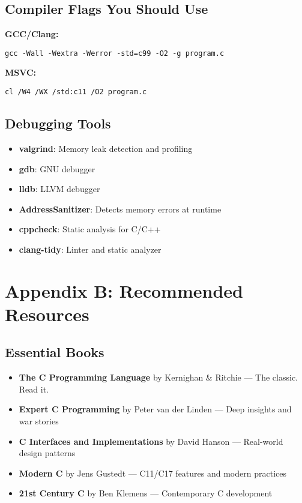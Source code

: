\documentclass[11pt,openany]{book}
\begin{document}
\section*{Compiler Flags You Should Use}

\textbf{GCC/Clang:}
\begin{verbatim}
gcc -Wall -Wextra -Werror -std=c99 -O2 -g program.c
\end{verbatim}

\textbf{MSVC:}
\begin{verbatim}
cl /W4 /WX /std:c11 /O2 program.c
\end{verbatim}

\section*{Debugging Tools}

\begin{itemize}
    \item \textbf{valgrind}: Memory leak detection and profiling
    \item \textbf{gdb}: GNU debugger
    \item \textbf{lldb}: LLVM debugger
    \item \textbf{AddressSanitizer}: Detects memory errors at runtime
    \item \textbf{cppcheck}: Static analysis for C/C++
    \item \textbf{clang-tidy}: Linter and static analyzer
\end{itemize}

\chapter{Appendix B: Recommended Resources}

\section*{Essential Books}

\begin{itemize}
    \item \textbf{The C Programming Language} by Kernighan \& Ritchie — The classic. Read it.
    \item \textbf{Expert C Programming} by Peter van der Linden — Deep insights and war stories
    \item \textbf{C Interfaces and Implementations} by David Hanson — Real-world design patterns
    \item \textbf{Modern C} by Jens Gustedt — C11/C17 features and modern practices
    \item \textbf{21st Century C} by Ben Klemens — Contemporary C development
\end{itemize}
\end{document}
